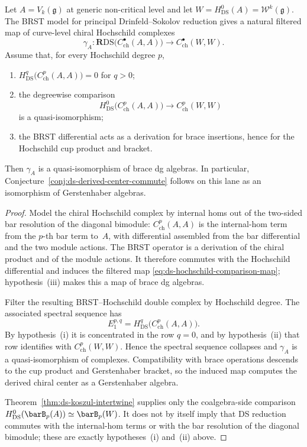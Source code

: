 \begin{proposition}
\label{prop:ds-hochschild-comparison-map}
Let $A=V_k(\mathfrak g)$ at generic non-critical level and let
$W=H^0_{\mathrm{DS}}(A)=\mathcal W^k(\mathfrak g)$. The BRST model
for principal Drinfeld--Sokolov reduction gives a natural filtered
map of curve-level chiral Hochschild complexes
\begin{equation}\label{eq:ds-hochschild-comparison-map}
\gamma_A\colon
\mathbf R\mathrm{DS}\bigl(C^\bullet_{\mathrm{ch}}(A,A)\bigr)
\longrightarrow
C^\bullet_{\mathrm{ch}}(W,W).
\end{equation}
Assume that, for every Hochschild degree $p$,
\begin{enumerate}[label=\textup{(\roman*)}]
\item $H^q_{\mathrm{DS}}\bigl(C^p_{\mathrm{ch}}(A,A)\bigr)=0$
 for $q>0$;
\item the degreewise comparison
 \[
 H^0_{\mathrm{DS}}\bigl(C^p_{\mathrm{ch}}(A,A)\bigr)
 \longrightarrow C^p_{\mathrm{ch}}(W,W)
 \]
 is a quasi-isomorphism;
\item the BRST differential acts as a derivation for brace
 insertions, hence for the Hochschild cup product and bracket.
\end{enumerate}
Then $\gamma_A$ is a quasi-isomorphism of brace dg algebras. In
particular, Conjecture~\ref{conj:ds-derived-center-commute} follows
on this lane as an isomorphism of Gerstenhaber algebras.
\end{proposition}

\begin{proof}
Model the chiral Hochschild complex by internal homs out of the
two-sided bar resolution of the diagonal bimodule:
$C^p_{\mathrm{ch}}(A,A)$ is the internal-hom term from the $p$-th
bar term to~$A$, with differential assembled from the bar differential
and the two module actions. The BRST operator is a derivation of the
chiral product and of the module actions. It therefore commutes with
the Hochschild differential and induces the filtered map
\eqref{eq:ds-hochschild-comparison-map}; hypothesis~\textup{(iii)}
makes this a map of brace dg algebras.

Filter the resulting BRST--Hochschild double complex by Hochschild
degree. The associated spectral sequence has
\[
E_1^{p,q}
=H^q_{\mathrm{DS}}\bigl(C^p_{\mathrm{ch}}(A,A)\bigr).
\]
By hypothesis~\textup{(i)} it is concentrated in the row $q=0$, and
by hypothesis~\textup{(ii)} that row identifies with
$C^p_{\mathrm{ch}}(W,W)$. Hence the spectral sequence collapses and
$\gamma_A$ is a quasi-isomorphism of complexes. Compatibility with
brace operations descends to the cup product and Gerstenhaber bracket,
so the induced map computes the derived chiral center as a
Gerstenhaber algebra.

Theorem~\ref{thm:ds-koszul-intertwine} supplies only the
coalgebra-side comparison
$H^0_{\mathrm{DS}}(\barB_p(A))\simeq\barB_p(W)$. It does not by
itself imply that DS reduction commutes with the internal-hom terms
or with the bar resolution of the diagonal bimodule; these are exactly
hypotheses~\textup{(i)} and~\textup{(ii)} above.
\end{proof}

